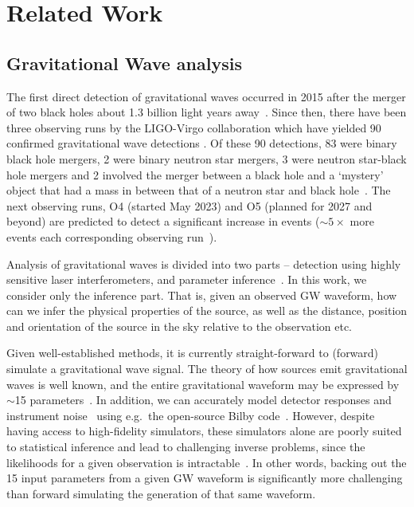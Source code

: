 \section{Related Work}
\label{sec:related_work}

\subsection{Gravitational Wave analysis}

The first direct detection of gravitational waves occurred in 2015 after the merger of two black holes about 1.3 billion light years away~\cite{LIGO_2016}. Since then, there have been three observing runs by the LIGO-Virgo collaboration which have yielded 90 confirmed gravitational wave detections . Of these 90 detections, 83 were binary black hole mergers, 2 were binary neutron star mergers, 3 were neutron star-black hole mergers and 2 involved the merger between a black hole and a `mystery' object that had a mass in between that of a neutron star and black hole~\cite{LIGO_FAQ_Website}. The next observing runs, O4 (started May 2023) and O5 (planned for 2027 and beyond) are predicted to detect a significant increase in events (${\sim}5\times$ more events each corresponding observing run~\cite{Petrov_2022}).

Analysis of gravitational waves is divided into two parts -- detection using highly sensitive laser interferometers, and parameter inference~\cite{bhardwaj2023peregrine}. In this work, we consider only the inference part. That is, given an observed GW waveform, how can we infer the physical properties of the source, as well as the distance, position and orientation of the source in the sky relative to the observation etc.

Given well-established methods, it is currently straight-forward to (forward) simulate a gravitational wave signal. The theory of how sources emit gravitational waves is well known, and the entire gravitational waveform may be expressed by $\sim$15 parameters~\cite{Thrane_Talbot_2019}. In addition, we can accurately model detector responses and instrument noise~\cite{alvey2023things} using e.g.~the open-source Bilby code~\cite{Ashton_Bilby_2019,Romero_Bilby_2020,Ashton_Talbot_Bilby_2021}. However, despite having access to high-fidelity simulators, these simulators alone are poorly suited to statistical inference and lead to challenging inverse problems, since the likelihoods for a given observation is intractable~\cite{Cranmer_SBI_2020}. In other words, backing out the 15 input parameters from a given GW waveform is significantly more challenging than forward simulating the generation of that same waveform.

